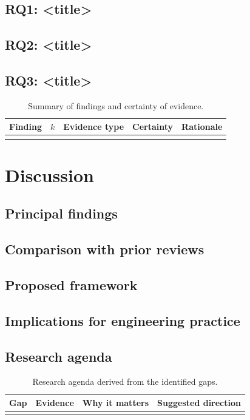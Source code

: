 \documentclass[11pt,a4paper]{article}
\begin{document}
\subsection{RQ1: <title>}

\subsection{RQ2: <title>}
\subsection{RQ3: <title>}

\begin{table}[t]
\centering\small
\caption{Summary of findings and certainty of evidence.}\label{tab:sof}
\begin{tabularx}{\linewidth}{@{}X c l l X@{}}
\toprule
Finding & $k$ & Evidence type & Certainty & Rationale \\
\midrule
 & & & & \\
\bottomrule
\end{tabularx}
\end{table}

\section{Discussion}\label{sec:discussion}
\subsection{Principal findings}
\subsection{Comparison with prior reviews}
\subsection{Proposed framework}
\subsection{Implications for engineering practice}
\subsection{Research agenda}
\begin{table}[t]
\centering\small
\caption{Research agenda derived from the identified gaps.}\label{tab:agenda}
\begin{tabularx}{\linewidth}{@{}X X X X@{}}
\toprule
Gap & Evidence & Why it matters & Suggested direction \\
\midrule
 & & & \\
\bottomrule
\end{tabularx}
\end{table}
\end{document}

